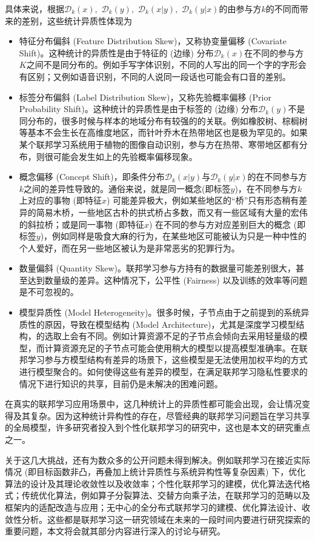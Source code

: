 \begin{itemize}
具体来说，根据$\mathcal{D}_k(x),$ $\mathcal{D}_k(y),$ $\mathcal{D}_k(x | y),$ $\mathcal{D}_k(y | x)$的由参与方$k$的不同而带来的差别，这些统计异质性体现为
\begin{itemize}
    \item 特征分布偏斜 (Feature Distribution Skew)，又称协变量偏移 (Covariate Shift)。这种统计的异质性是由于特征的 (边缘) 分布$\mathcal{D}_k(x)$在不同的参与方$K$之间不是同分布的。例如手写字体识别，不同的人写出的同一个字的字形会有区别；又例如语音识别，不同的人说同一段话也可能会有口音的差别。
    \item 标签分布偏斜 (Label Distribution Skew)，又称先验概率偏移 (Prior Probability Shift)。这种统计的异质性是由于标签的 (边缘) 分布$\mathcal{D}_k(y)$不是同分布的，很多时候与样本的地域分布有较强的的关联。例如橡胶树、棕榈树等基本不会生长在高维度地区，而针叶乔木在热带地区也是极为罕见的。如果某个联邦学习系统用于植物的图像自动识别，参与方在热带、寒带地区都有分布，则很可能会发生如上的先验概率偏移现象。
    \item 概念偏移 (Concept Shift)，即条件分布$\mathcal{D}_k(x | y)$与$\mathcal{D}_k(y | x)$的在不同参与方$k$之间的差异性导致的。通俗来说，就是同一概念(即标签$y$)，在不同参与方$k$上对应的事物 (即特征$x$) 可能差异极大，例如某些地区的``桥''只有形态稍有差异的简易木桥，一些地区古朴的拱式桥占多数，而又有一些区域有大量的宏伟的斜拉桥；或是同一事物 (即特征$x$) 在不同的参与方对应差别巨大的概念 (即标签$y$)，例如同样是吸食大麻的行为，在某些地区可能被认为只是一种中性的个人爱好，而在另一些地区被认为是非常恶劣的犯罪行为。
    \item 数量偏斜 (Quantity Skew)。联邦学习参与方持有的数据量可能差别很大，甚至达到数量级的差异。这种情况下，公平性 (Fairness) 以及训练的效率等问题是不可忽视的。
\item 模型异质性 (Model Heterogeneity)。很多时候，子节点由于之前提到的系统异质性的原因，导致在模型结构 (Model Architecture)，尤其是深度学习模型结构，的选取上会有不同。例如计算资源不足的子节点会倾向去采用轻量级的模型，而计算资源充足的子节点可能会使用稍大的模型以提高模型准确率。在联邦学习参与方模型结构有差异的场景下，这些模型是无法使用加权平均\cite{mcmahan2017fed_avg}的方式进行模型聚合的。如何使得这些有差异的模型，在满足联邦学习隐私性要求的情况下进行知识的共享，目前仍是未解决的困难问题。
\end{itemize}
在真实的联邦学习应用场景中，这几种统计上的异质性都可能会出现，会让情况变得及其复杂。因为这种统计异构性的存在，尽管经典的联邦学习问题旨在学习共享的全局模型，许多研究者投入到个性化联邦学习的研究中，这也是本文的研究重点之一。
\end{itemize}

关于这几大挑战，还有为数众多的公开问题未得到解决。例如联邦学习在接近实际情况 (即目标函数非凸，再叠加上统计异质性与系统异构性等复杂因素) 下，优化算法的设计及其理论收敛性以及收敛率；个性化联邦学习的建模，优化算法迭代格式；传统优化算法，例如算子分裂算法、交替方向乘子法，在联邦学习的范畴以及框架内的适配改造与应用；无中心的全分布式联邦学习的建模、优化算法设计、收敛性分析。这些都是联邦学习这一研究领域在未来的一段时间内要进行研究探索的重要问题，本文将会就其部分内容进行深入的讨论与研究。
